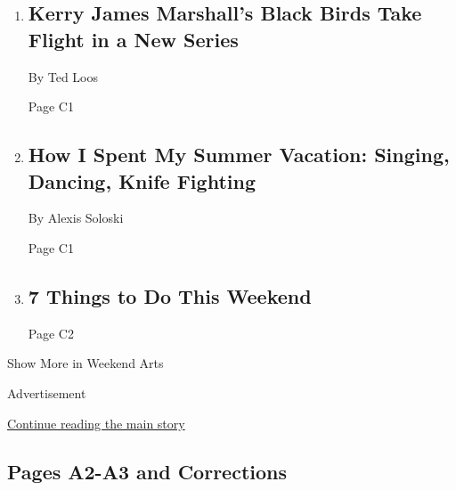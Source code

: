 \begin{enumerate}
\def\labelenumi{\arabic{enumi}.}
\item
  \href{/2020/07/29/arts/design/kerry-james-marshall-audubon.html}{}

  \hypertarget{kerry-james-marshalls-black-birds-take-flight-in-a-new-series-1}{%
  \subsection{Kerry James Marshall's Black Birds Take Flight in a New
  Series}\label{kerry-james-marshalls-black-birds-take-flight-in-a-new-series-1}}

  By Ted Loos

  Page C1
\item
  \href{/2020/07/30/theater/theater-classes-at-home.html}{}

  \hypertarget{how-i-spent-my-summer-vacation-singing-dancing-knife-fighting}{%
  \subsection{How I Spent My Summer Vacation: Singing, Dancing, Knife
  Fighting}\label{how-i-spent-my-summer-vacation-singing-dancing-knife-fighting}}

  By Alexis Soloski

  Page C1
\item
  \href{/2020/07/30/arts/things-to-do-weekend-coronavirus.html}{}

  \hypertarget{7-things-to-do-this-weekend}{%
  \subsection{7 Things to Do This
  Weekend}\label{7-things-to-do-this-weekend}}

  Page C2
\end{enumerate}

Show More in Weekend Arts

Advertisement

\protect\hyperlink{after-mid5}{Continue reading the main story}

\hypertarget{pages-a2-a3-and-corrections}{%
\subsection{Pages A2-A3 and
Corrections}\label{pages-a2-a3-and-corrections}}

